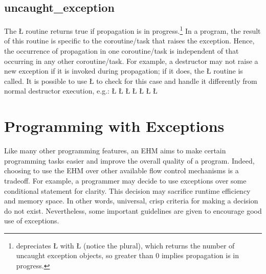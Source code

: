 \documentclass[openright,twoside]{report}
\begin{document}
\subsection{\texorpdfstring{\BGfont uncaught\_exception}{uncaught\_exception}}

The \LGinlinetrue\LGbegin\lgrinde\L{}\endlgrinde\LGend{} routine returns true if propagation is in progress.\footnote{
 depreciates \LGinlinetrue\LGbegin\lgrinde\L{}\endlgrinde\LGend{} with \LGinlinetrue\LGbegin\lgrinde\L{}\endlgrinde\LGend{} (notice the plural), which returns the number of uncaught exception objects, so greater than 0 implies propagation is in progress.}
In a \uC program, the result of this routine is specific to the coroutine/task that raises the exception.
Hence, the occurrence of propagation in one coroutine/task is independent of that occurring in any other coroutine/task.
For example, a destructor may not raise a new exception if it is invoked during propagation;
if it does, the \LGinlinetrue\LGbegin\lgrinde\L{}\endlgrinde\LGend{} routine is called.
It is possible to use \LGinlinetrue\LGbegin\lgrinde\L{}\endlgrinde\LGend{} to check for this case and handle it differently from normal destructor execution, e.g.:
\LGinlinefalse\LGbegin\lgrinde
\L{}
\CE{}\L{\LB{}}
\CE{}\L{\LB{}}
\CE{}\L{\LB{}}
\L{\LB{}}
\CE{}\L{\LB{}}
\L{\LB{\}}}
\endlgrinde\LGend


\section{Programming with Exceptions}

Like many other programming features, an EHM aims to make certain programming tasks easier and improve the overall quality of a program.
Indeed, choosing to use the EHM over other available flow control mechanisms is a tradeoff.
For example, a programmer may decide to use exceptions over some conditional statement for clarity.
This decision may sacrifice runtime efficiency and memory space.
In other words, universal, crisp criteria for making a decision do not exist.
Nevertheless, some important guidelines are given to encourage good use of exceptions.
\end{document}
